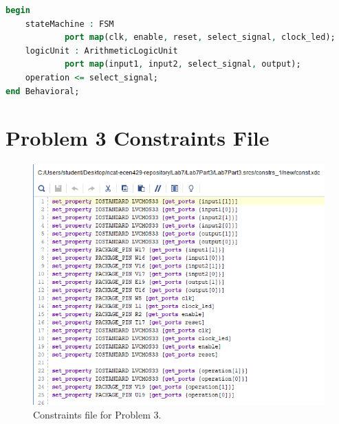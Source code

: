 \documentclass[11pt]{article}
\begin{document}
\begin{appendices}
\begin{lstlisting}[language=VHDL]
begin
    stateMachine : FSM 
    		port map(clk, enable, reset, select_signal, clock_led);
    logicUnit : ArithmeticLogicUnit 
    		port map(input1, input2, select_signal, output);
    operation <= select_signal;
end Behavioral;
\end{lstlisting}

\section{Problem 3 Constraints File}
\begin{center}
\begin{figure}[H]
	\includegraphics[scale=1]{./images/Lab7Part3Const.png}
	\caption{\label{fig:Prob1Const}Constraints file for Problem 3.}
\end{figure}
\end{center}

\end{appendices}
\end{document}
